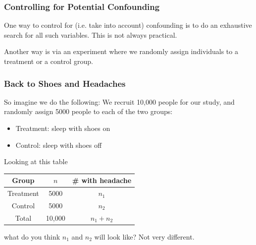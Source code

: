 \documentclass[handout]{beamer}
\newcommand{\blue}[1]{\textcolor{blue2}{#1}}
\begin{document}
\begin{frame}
\frametitle{Controlling for Potential Confounding}

One way to \blue{control for} (i.e. take into account) confounding is to do an exhaustive search for all such variables.  This is not always practical.

\vspace{0.25cm}

\pause Another way is via an experiment where we randomly assign individuals to a \blue{treatment} or a \blue{control} group.


\end{frame}


\begin{frame}
\frametitle{Back to Shoes and Headaches}

So imagine we do the following:  We recruit 10,000 people for our study, and \blue{randomly assign} 5000 people to each of the two groups:

\pause\begin{itemize}
\item Treatment: sleep with shoes \blue{on}
\item Control: sleep with shoes \blue{off}
\end{itemize}

\pause Looking at this table
\begin{center}
	\begin{tabular}{c|cc}
		Group & $n$ & \# with headache\\
		\hline	
		Treatment & 5000 & $n_1$\\
		Control & 5000 & $n_2$\\
		\hline
		Total & 10,000 & $n_1 + n_2$\\
  \end{tabular}
\end{center}
\pause what do you think $n_1$ and $n_2$ will look like?  \pause Not very different.

\end{frame}
\end{document}
